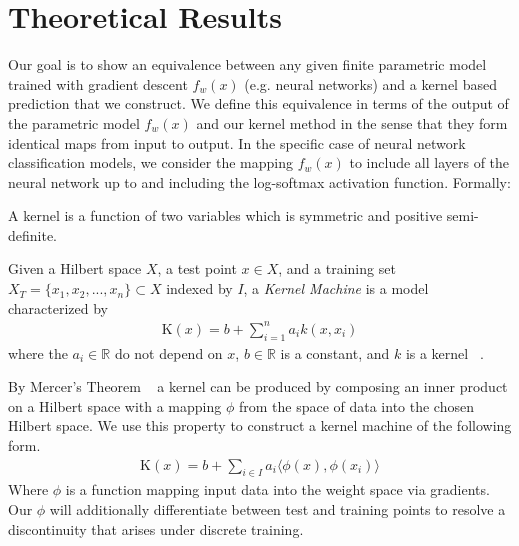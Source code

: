 
\section{Theoretical Results}

Our goal is to show an equivalence between any given finite parametric model trained with gradient descent $f_w(x)$  (e.g. neural networks) and a kernel based prediction that we construct. We define this equivalence in terms of the output of the parametric model $f_w(x)$ and our kernel method in the sense that they form identical maps from input to output. In the specific case of neural network classification models, we consider the mapping $f_w(x)$ to include all layers of the neural network up to and including the log-softmax activation function. Formally:
\begin{definition}
A {kernel} is a function of two variables which is symmetric and positive semi-definite. 
\end{definition}

\begin{definition}
Given a Hilbert space $X$, a test point $x \in X$, and a training set $X_T = \{x_1,x_2,...,x_n\} \subset X$ indexed by $I$, a \emph{Kernel Machine} is a model characterized by 
\begin{align}
    \text{K}(x) = b + \sum_{i=1}^n a_i k(x,x_i)
\end{align}
where the $a_i \in \mathbb{R}$ do not depend on $x$, $b \in \mathbb{R}$ is a constant, and $k$ is a kernel ~\citep{rasmussen2006gaussian}.
\end{definition}

By Mercer's Theorem ~\citep{ghojogh2021} a kernel can be produced by composing an inner product on a Hilbert space with a mapping $\phi$ from the space of data into the chosen Hilbert space.
We use this property to construct a kernel machine of the following form.
\begin{align}
    \text{K}(x) = b + \sum_{i\in I} a_i \langle \phi(x), \phi(x_i) \rangle
\end{align}
Where $\phi$ is a function mapping input data into the weight space via gradients. Our $\phi$ will additionally differentiate between test and training points to resolve a discontinuity that arises under discrete training. 

